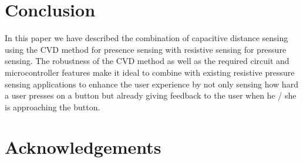 \documentclass{sigchi-ext}
\begin{document}


\section{Conclusion}
In this paper we have described the combination of capacitive distance sensing
using the CVD method for presence sensing with resistive sensing for pressure
sensing. The robustness of the CVD method as well as the required circuit and
microcontroller features make it ideal to combine with existing resistive
pressure sensing applications to enhance the user experience by not only sensing
how hard a user presses on a button but already giving feedback to the user when
he / she is approaching the button.
\section{Acknowledgements}

\balance{} 


\end{document}
